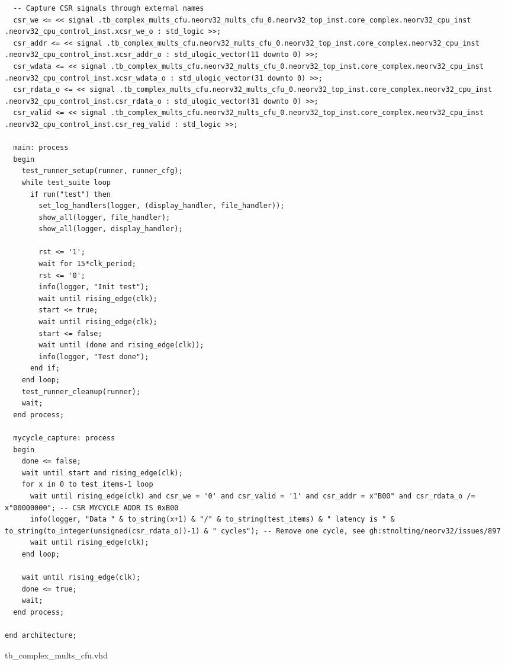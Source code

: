 \begin{code}
\begin{verbatim}
  -- Capture CSR signals through external names
  csr_we <= << signal .tb_complex_mults_cfu.neorv32_mults_cfu_0.neorv32_top_inst.core_complex.neorv32_cpu_inst .neorv32_cpu_control_inst.xcsr_we_o : std_logic >>;
  csr_addr <= << signal .tb_complex_mults_cfu.neorv32_mults_cfu_0.neorv32_top_inst.core_complex.neorv32_cpu_inst .neorv32_cpu_control_inst.xcsr_addr_o : std_ulogic_vector(11 downto 0) >>;
  csr_wdata <= << signal .tb_complex_mults_cfu.neorv32_mults_cfu_0.neorv32_top_inst.core_complex.neorv32_cpu_inst .neorv32_cpu_control_inst.xcsr_wdata_o : std_ulogic_vector(31 downto 0) >>;
  csr_rdata_o <= << signal .tb_complex_mults_cfu.neorv32_mults_cfu_0.neorv32_top_inst.core_complex.neorv32_cpu_inst .neorv32_cpu_control_inst.csr_rdata_o : std_ulogic_vector(31 downto 0) >>;
  csr_valid <= << signal .tb_complex_mults_cfu.neorv32_mults_cfu_0.neorv32_top_inst.core_complex.neorv32_cpu_inst .neorv32_cpu_control_inst.csr_reg_valid : std_logic >>;

  main: process
  begin
    test_runner_setup(runner, runner_cfg);
    while test_suite loop
      if run("test") then
        set_log_handlers(logger, (display_handler, file_handler));
        show_all(logger, file_handler);
        show_all(logger, display_handler);

        rst <= '1';
        wait for 15*clk_period;
        rst <= '0';
        info(logger, "Init test");
        wait until rising_edge(clk);
        start <= true;
        wait until rising_edge(clk);
        start <= false;
        wait until (done and rising_edge(clk));
        info(logger, "Test done");
      end if;
    end loop;
    test_runner_cleanup(runner);
    wait;
  end process;

  mycycle_capture: process
  begin
    done <= false;
    wait until start and rising_edge(clk);
    for x in 0 to test_items-1 loop
      wait until rising_edge(clk) and csr_we = '0' and csr_valid = '1' and csr_addr = x"B00" and csr_rdata_o /= x"00000000"; -- CSR MYCYCLE ADDR IS 0xB00
      info(logger, "Data " & to_string(x+1) & "/" & to_string(test_items) & " latency is " & to_string(to_integer(unsigned(csr_rdata_o))-1) & " cycles"); -- Remove one cycle, see gh:stnolting/neorv32/issues/897
      wait until rising_edge(clk);
    end loop;
    
    wait until rising_edge(clk);
    done <= true;
    wait;
  end process;

end architecture;
\end{verbatim}
\caption{tb\_complex\_mults\_cfu.vhd}
\label{ap-cod:19}
\end{code}

